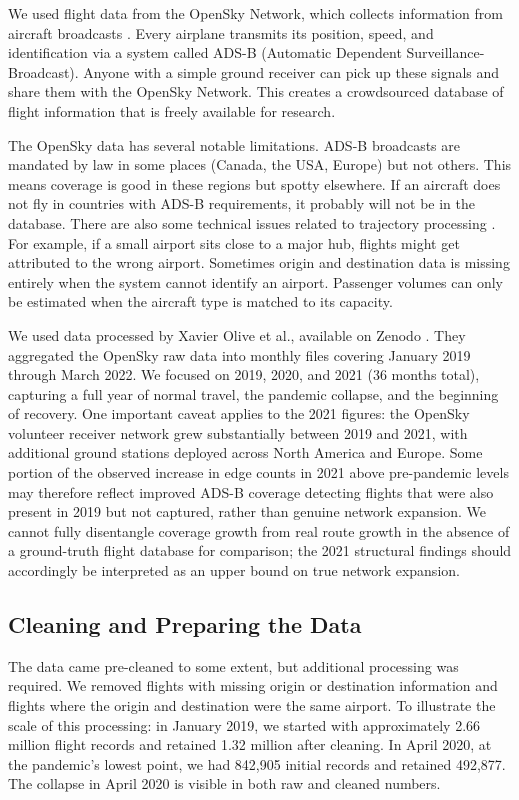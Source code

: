 \documentclass{elsarticle}
\begin{document}
We used flight data from the OpenSky Network, which collects information from aircraft broadcasts \cite{OpenSky_dataset}. Every airplane transmits its position, speed, and identification via a system called ADS-B (Automatic Dependent Surveillance-Broadcast). Anyone with a simple ground receiver can pick up these signals and share them with the OpenSky Network. This creates a crowdsourced database of flight information that is freely available for research.

The OpenSky data has several notable limitations. ADS-B broadcasts are mandated by law in some places (Canada, the USA, Europe) \cite{CAN_ADSB, US_ADSB, EU_ADSB} but not others. This means coverage is good in these regions but spotty elsewhere. If an aircraft does not fly in countries with ADS-B requirements, it probably will not be in the database. There are also some technical issues related to trajectory processing \cite{Baek_ADS-B}. For example, if a small airport sits close to a major hub, flights might get attributed to the wrong airport. Sometimes origin and destination data is missing entirely when the system cannot identify an airport. Passenger volumes can only be estimated when the aircraft type is matched to its capacity.

We used data processed by Xavier Olive et al., available on Zenodo \cite{xavier_olive_2022}. They aggregated the OpenSky raw data into monthly files covering January 2019 through March 2022. We focused on 2019, 2020, and 2021 (36 months total), capturing a full year of normal travel, the pandemic collapse, and the beginning of recovery. One important caveat applies to the 2021 figures: the OpenSky volunteer receiver network grew substantially between 2019 and 2021, with additional ground stations deployed across North America and Europe. Some portion of the observed increase in edge counts in 2021 above pre-pandemic levels may therefore reflect improved ADS-B coverage detecting flights that were also present in 2019 but not captured, rather than genuine network expansion. We cannot fully disentangle coverage growth from real route growth in the absence of a ground-truth flight database for comparison; the 2021 structural findings should accordingly be interpreted as an upper bound on true network expansion.

\subsection{Cleaning and Preparing the Data}

The data came pre-cleaned to some extent, but additional processing was required. We removed flights with missing origin or destination information and flights where the origin and destination were the same airport. To illustrate the scale of this processing: in January 2019, we started with approximately 2.66 million flight records and retained 1.32 million after cleaning. In April 2020, at the pandemic's lowest point, we had 842,905 initial records and retained 492,877. The collapse in April 2020 is visible in both raw and cleaned numbers.
\end{document}
